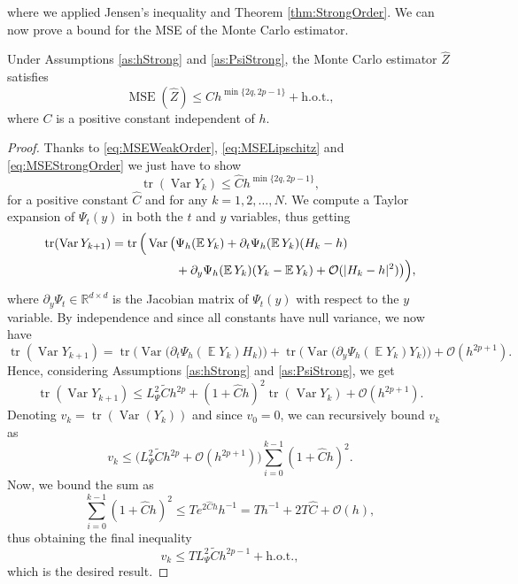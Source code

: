 \documentclass{siamart1116}
\numberwithin{theorem}{section}
\DeclarePairedDelimiter{\abs}{\lvert}{\rvert}
\newcommand{\R}{\mathbb{R}}
\newcommand{\OO}{\mathcal{O}}
\newcommand{\Var}{\operatorname{Var}}
\newcommand{\E}{\operatorname{\mathbb{E}}}
\newcommand{\MSE}{\operatorname{MSE}}
\newcommand{\trace}{\operatorname{tr}}
\newcommand{\sksum}{{\textstyle\sum}}
\newcommand{\corr}[1]{{\color{bordeaux}#1}}
\begin{document}
where we applied Jensen's inequality and Theorem \ref{thm:StrongOrder}. We can now prove a bound for the MSE of the Monte Carlo estimator.
\begin{theorem}\label{thm:MSEMonteCarlo} Under Assumptions \ref{as:hStrong} and \ref{as:PsiStrong}, the Monte Carlo estimator $\hat Z$ satisfies
	\begin{equation}
		\MSE(\hat Z) \leq C h^{\min\{2q, 2p -1\}} + \mathrm{h.o.t.},
	\end{equation}
	where $C$ is a positive constant independent of $h$.
\end{theorem}
\begin{proof} Thanks to \eqref{eq:MSEWeakOrder}, \eqref{eq:MSELipschitz} and \eqref{eq:MSEStrongOrder} we just have to show
	\begin{equation}
		\trace(\Var Y_k) \leq \hat C h^{\min\{2q, 2p - 1\}},
	\end{equation}
	for a positive constant $\hat C$ and for any $k = 1, 2, \ldots, N$. We compute a Taylor expansion of $\Psi_t(y)$ in both the $t$ and $y$ variables, thus getting
	\begin{equation}
	\begin{aligned}
		\trace(\Var Y_{k+1}) = \trace\Big(\Var\big(&\Psi_h(\E Y_k) + \partial_t \Psi_h(\E Y_k)(H_{k} - h) \\
		&+ \partial_y \Psi_h(\E Y_k)(Y_k - \E Y_k) + \OO(\abs{H_k - h}^2)\big)\Big),
	\end{aligned}
	\end{equation}
	where $\partial_y\Psi_t \in \R^{d\times d}$ is the Jacobian matrix of $\Psi_t(y)$ with respect to the $y$ variable. By independence and since all constants have null variance, we now have
	\begin{equation}
		\trace(\Var Y_{k+1}) = \trace\Big(\Var\big(\partial_t \Psi_h(\E Y_k)H_k\big)\Big) + \trace\Big(\Var\big(\partial_y \Psi_h(\E Y_k)Y_k\big)\Big) + \OO(h^{2p + 1}).
	\end{equation}
	Hence, considering Assumptions \ref{as:hStrong} and \ref{as:PsiStrong}, we get
	\begin{equation}
		\trace(\Var Y_{k+1}) \leq L_\Psi^2 \tilde Ch^{2p} + (1 + \hat C h)^2 \trace(\Var Y_k) + \OO(h^{2p + 1}).
	\end{equation}
	Denoting $v_k = \trace(\Var(Y_k))$ and since $v_0 = 0$, we can recursively bound $v_k$ as
	\begin{equation}
		v_k \leq \big(L_\Psi^2\tilde Ch^{2p} + \OO(h^{2p+1})\big) \sksum_{i=0}^{k-1}(1 + \hat C h)^2.
	\end{equation}
	\corr{Now, we bound the sum as
	\begin{equation}
		\sksum_{i=0}^{k-1}(1 + \hat Ch)^2 \leq Te^{2\hat C h}h^{-1} = Th^{-1} + 2T\hat C + \OO(h),
	\end{equation}
	thus obtaining the final inequality
	\begin{equation}
		v_k \leq TL_\Psi^2 \tilde C h^{2p - 1} + \mathrm{h.o.t.},
	\end{equation}}
	which is the desired result.
\end{proof}
\end{document}
